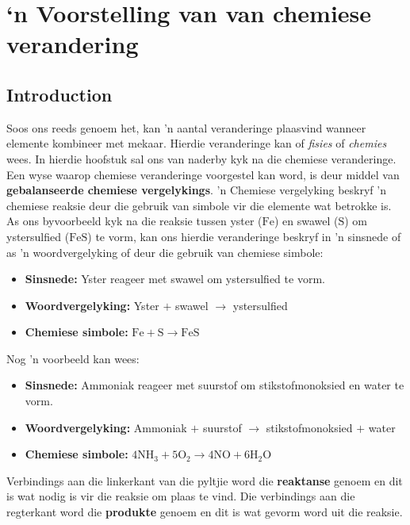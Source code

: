          \chapter{‘n Voorstelling van van chemiese verandering}
    \setcounter{figure}{1}
    \setcounter{subfigure}{1}
    \label{337cc49099d6e82169c54b5d0fc3878f}
         \section{Introduction}
    \nopagebreak

Soos ons reeds genoem het, kan 'n aantal veranderinge plaasvind wanneer elemente kombineer met mekaar. Hierdie veranderinge kan of \textsl{fisies} of \textsl{chemies} wees. In hierdie hoofstuk sal ons van naderby kyk na die chemiese veranderinge. Een wyse waarop chemiese veranderinge voorgestel kan word, is deur middel van \textbf{gebalanseerde chemiese vergelykings}. 'n Chemiese vergelyking beskryf 'n chemiese reaksie deur die gebruik van simbole vir die elemente wat betrokke is. As ons byvoorbeeld kyk na die reaksie tussen yster ($\text{Fe}$) en swawel ($\text{S}$) om ystersulfied ($\text{FeS}$) te vorm, kan ons hierdie veranderinge beskryf in 'n sinsnede of as 'n woordvergelyking of deur die gebruik van chemiese simbole:
\begin{itemize}[noitemsep]
\item \textbf{Sinsnede:} Yster reageer met swawel om ystersulfied te vorm.
\item \textbf{Woordvergelyking:} Yster $+$ swawel $\to$ ystersulfied 
\item \textbf{Chemiese simbole:} $\text{Fe} + \text{S} \to \text{FeS}$
\end{itemize}
Nog 'n voorbeeld kan wees:
\begin{itemize}[noitemsep]
\item \textbf{Sinsnede:} Ammoniak reageer met suurstof om stikstofmonoksied en water te vorm.
\item \textbf{Woordvergelyking:} Ammoniak $+$ suurstof $\to$ stikstofmonoksied $+$ water
\item \textbf{Chemiese simbole:} $4{\text{NH}}_{3} + 5{\text{O}}_{2} \to 4\text{NO} + 6{\text{H}}_{2}\text{O}$
\end{itemize} 
Verbindings aan die linkerkant van die pyltjie word die \textbf{reaktanse} genoem en dit is wat nodig is vir die
reaksie om plaas te vind. Die verbindings aan die regterkant word die \textbf{produkte} genoem en dit is wat
gevorm word uit die reaksie.\par 
